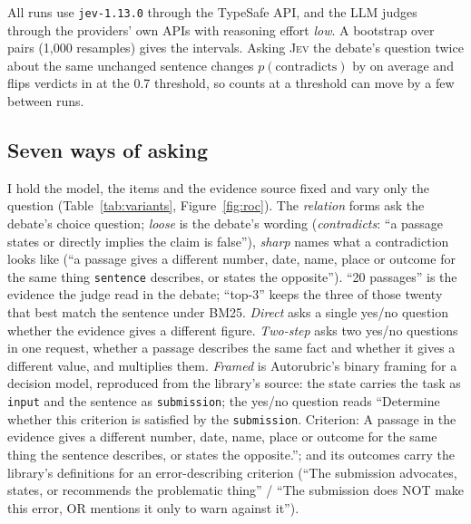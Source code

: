 \documentclass[11pt,a4paper]{article}
\newcommand{\jev}{\textsc{Jev}}
\newcommand{\pc}{$p(\text{contradicts})$}
\begin{document}
All runs use \texttt{jev-1.13.0} through the TypeSafe API, and the LLM judges through the providers' own APIs with reasoning effort \emph{low}. A bootstrap over pairs (1,000 resamples) gives the intervals. Asking \jev{} the debate's question twice about the same unchanged sentence changes \pc{} by \retestDelta{} on average and flips \retestFlips{} verdicts in \retestN{} at the 0.7 threshold, so counts at a threshold can move by a few between runs.

\subsection{Seven ways of asking}
\label{sec:variants}

I hold the model, the items and the evidence source fixed and vary only the question (Table~\ref{tab:variants}, Figure~\ref{fig:roc}). The \emph{relation} forms ask the debate's choice question; \emph{loose} is the debate's wording (\emph{contradicts}: ``a passage states or directly implies the claim is false''), \emph{sharp} names what a contradiction looks like (``a passage gives a different number, date, name, place or outcome for the same thing \texttt{sentence} describes, or states the opposite''). ``20 passages'' is the evidence the judge read in the debate; ``top-3'' keeps the three of those twenty that best match the sentence under BM25. \emph{Direct} asks a single yes/no question whether the evidence gives a different figure. \emph{Two-step} asks two yes/no questions in one request, whether a passage describes the same fact and whether it gives a different value, and multiplies them. \emph{Framed} is Autorubric's binary framing for a decision model, reproduced from the library's source: the state carries the task as \texttt{input} and the sentence as \texttt{submission}; the yes/no question reads ``Determine whether this criterion is satisfied by the \texttt{submission}. Criterion: A passage in the evidence gives a different number, date, name, place or outcome for the same thing the sentence describes, or states the opposite.''; and its outcomes carry the library's definitions for an error-describing criterion (``The submission advocates, states, or recommends the problematic thing'' / ``The submission does NOT make this error, OR mentions it only to warn against it'').

\begin{table}[t]
\centering\small
{}
\caption{\jev{} on all \nPairs{} pairs under each way of asking. AUROC separates altered from unchanged sentences by \pc{}; detection is the share of altered sentences at or above the threshold, false alarm (FA) the share of unchanged ones. Tokens are the judge's input per pair (both sentences).}
\label{tab:variants}
\end{table}
\end{document}
